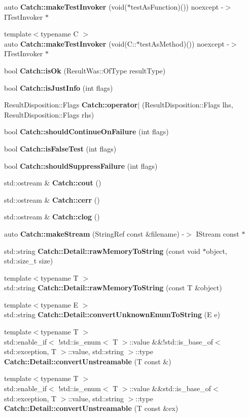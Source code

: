 \begin{DoxyCompactItemize}
auto \textbf{ Catch\+::make\+Test\+Invoker} (void($\ast$test\+As\+Function)()) noexcept -\/$>$ I\+Test\+Invoker $\ast$
\item 
{\footnotesize template$<$typename C $>$ }\\auto \textbf{ Catch\+::make\+Test\+Invoker} (void(C\+::$\ast$test\+As\+Method)()) noexcept -\/$>$ I\+Test\+Invoker $\ast$
\item 
bool \textbf{ Catch\+::is\+Ok} (Result\+Was\+::\+Of\+Type result\+Type)
\item 
bool \textbf{ Catch\+::is\+Just\+Info} (int flags)
\item 
Result\+Disposition\+::\+Flags \textbf{ Catch\+::operator$\vert$} (Result\+Disposition\+::\+Flags lhs, Result\+Disposition\+::\+Flags rhs)
\item 
bool \textbf{ Catch\+::should\+Continue\+On\+Failure} (int flags)
\item 
bool \textbf{ Catch\+::is\+False\+Test} (int flags)
\item 
bool \textbf{ Catch\+::should\+Suppress\+Failure} (int flags)
\item 
std\+::ostream \& \textbf{ Catch\+::cout} ()
\item 
std\+::ostream \& \textbf{ Catch\+::cerr} ()
\item 
std\+::ostream \& \textbf{ Catch\+::clog} ()
\item 
auto \textbf{ Catch\+::make\+Stream} (String\+Ref const \&filename) -\/$>$ I\+Stream const $\ast$
\item 
std\+::string \textbf{ Catch\+::\+Detail\+::raw\+Memory\+To\+String} (const void $\ast$object, std\+::size\+\_\+t size)
\item 
{\footnotesize template$<$typename T $>$ }\\std\+::string \textbf{ Catch\+::\+Detail\+::raw\+Memory\+To\+String} (const T \&object)
\item 
{\footnotesize template$<$typename E $>$ }\\std\+::string \textbf{ Catch\+::\+Detail\+::convert\+Unknown\+Enum\+To\+String} (E e)
\item 
{\footnotesize template$<$typename T $>$ }\\std\+::enable\+\_\+if$<$ !std\+::is\+\_\+enum$<$ T $>$\+::value \&\&!std\+::is\+\_\+base\+\_\+of$<$ std\+::exception, T $>$\+::value, std\+::string $>$\+::type \textbf{ Catch\+::\+Detail\+::convert\+Unstreamable} (T const \&)
\item 
{\footnotesize template$<$typename T $>$ }\\std\+::enable\+\_\+if$<$ !std\+::is\+\_\+enum$<$ T $>$\+::value \&\&std\+::is\+\_\+base\+\_\+of$<$ std\+::exception, T $>$\+::value, std\+::string $>$\+::type \textbf{ Catch\+::\+Detail\+::convert\+Unstreamable} (T const \&ex)

\end{DoxyCompactItemize}
